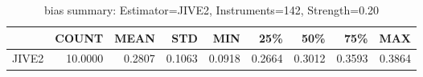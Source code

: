 \begin{table}[ht]
\centering
\caption{bias summary: Estimator=JIVE2, Instruments=142, Strength=0.20}
\begin{tabular}{lrrrrrrrr}
\toprule
 & COUNT & MEAN & STD & MIN & 25\% & 50\% & 75\% & MAX \\
\midrule
JIVE2 & 10.0000 & 0.2807 & 0.1063 & 0.0918 & 0.2664 & 0.3012 & 0.3593 & 0.3864 \\
\bottomrule
\end{tabular}
\end{table}
